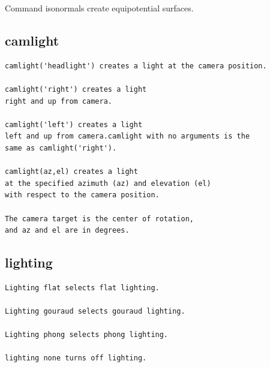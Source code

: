 \documentclass{ximera}
\begin{document}
Command isonormals create equipotential surfaces. 
\subsection{camlight}

\begin{verbatim}
camlight('headlight') creates a light at the camera position.

camlight('right') creates a light
right and up from camera.

camlight('left') creates a light
left and up from camera.camlight with no arguments is the
same as camlight('right').

camlight(az,el) creates a light
at the specified azimuth (az) and elevation (el)
with respect to the camera position.

The camera target is the center of rotation, 
and az and el are in degrees.

\end{verbatim}



\subsection{lighting}


\begin{verbatim}
Lighting flat selects flat lighting.

Lighting gouraud selects gouraud lighting.

Lighting phong selects phong lighting.

lighting none turns off lighting.
\end{verbatim}
\end{document}
